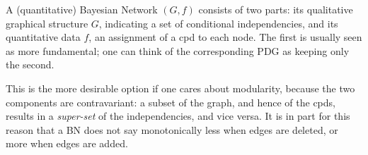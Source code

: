\documentclass{article}
\theoremstyle{plain}
\theoremstyle{definition}
\theoremstyle{remark}
\numberwithin{equation}{section}
\begin{document}
		
	A (quantitative) Bayesian Network $(G, f)$ consists of two parts: its qualitative graphical structure $G$, indicating a set of conditional independencies, and its quantitative data $f$, an assignment of a cpd to each node.
	The first is usually seen as more fundamental;
%
	one can think of the corresponding PDG as keeping only the second. 
        \begin{vfull}
	This is the more desirable option if one cares about
	modularity, because the two components are contravariant: a subset of
	the graph, and hence of the cpds, results in a \emph{super-set} of
	the independencies, and vice versa. It is in part for this reason
	that a BN does not say monotonically less when edges are deleted, or
	more when edges are added. 
\end{vfull}
\end{document}
